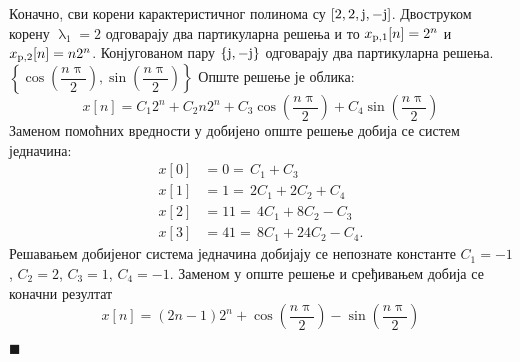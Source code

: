 Коначно, сви корени карактеристичног полинома су
$[2,2,{\rm j},-{\rm j}]$. Двоструком корену 
$\uplambda_1 = 2$ одговарају два партикуларна решења
и то $x_{\rm p,1}[n] = 2^n$ и $x_{\rm p,2}[n] = n 2^n$.
Конјугованом пару $\{{\rm j}, -{\rm j}\}$ одговарају 
два партикуларна решења. 
$\left\{ 
\cos\left( 
\dfrac{n\uppi}{2}
\right),
\sin\left( 
\dfrac{n\uppi}{2}
\right)
\right\}
$
Опште решење је облика:
\begin{equation}
x[n] = C_1 2^n + C_2 n2^n + C_3
\cos\left( 
\dfrac{n\uppi}{2}
\right)
+ C_4
\sin\left( 
\dfrac{n\uppi}{2}
\right)
\end{equation}
Заменом помоћних вредности у добијено опште решење 
добија се систем једначина:
\begin{equation}
\begin{aligned}
x[0] &= 0 = \, C_1 + C_3 \\
x[1] &= 1 = \, 2C_1 + 2C_2 + C_4 \\
x[2] &= 11 = \, 4C_1 + 8C_2 - C_3\\
x[3] &= 41 = \, 8C_1 + 24C_2 - C_4.
\end{aligned}
\end{equation}
Решавањем добијеног система једначина добијају се 
непознате константе 
$C_1 = -1$, $C_2 = 2$, $C_3 = 1$, $C_4 = -1$. Заменом
у опште решење и сређивањем добија се коначни резултат
\begin{equation}
x[n] = (2n - 1)2^n + \cos\left( 
\dfrac{n\uppi}{2}
\right)
-
\sin\left( 
\dfrac{n\uppi}{2}
\right)
\end{equation}
\begin{flushright}
$\blacksquare$
\end{flushright}

